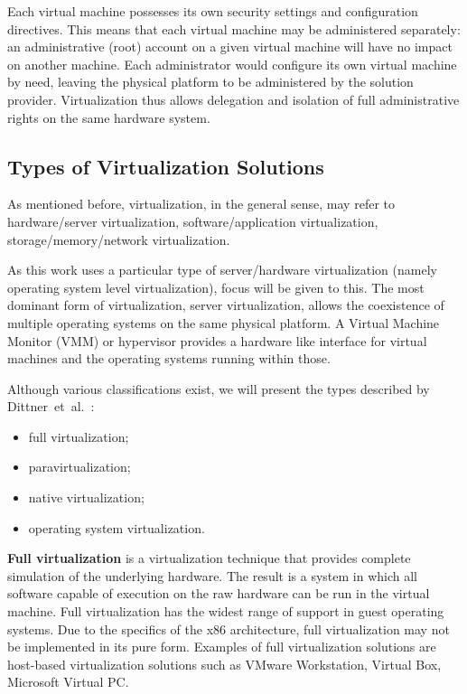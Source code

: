 Each virtual machine possesses its own security settings and configuration
directives. This means that each virtual machine may be administered
separately: an administrative (root) account on a given virtual machine will
have no impact on another machine. Each administrator would configure its own
virtual machine by need, leaving the physical platform to be administered by
the solution provider. Virtualization thus allows delegation and isolation of
full administrative rights on the same hardware system.

\subsection{Types of Virtualization Solutions}

As mentioned before, virtualization, in the general sense, may refer to
hardware/server virtualization, software/application virtualization,
storage/memory/network virtualization.

As this work uses a particular type of server/hardware virtualization (namely
operating system level virtualization), focus will be given to this. The most
dominant form of virtualization, server virtualization, allows the coexistence
of multiple operating systems on the same physical platform. A Virtual Machine
Monitor (VMM) or hypervisor provides a hardware like interface for virtual
machines and the operating systems running within those.

Although various classifications exist, we will present the types described by
Dittner~et~al.~\cite{best-damn-virt}:

\begin{itemize}
  \item full virtualization;
  \item paravirtualization;
  \item native virtualization;
  \item operating system virtualization.
\end{itemize}

\textbf{Full virtualization} is a virtualization technique that provides
complete simulation of the underlying hardware. The result is a system in
which all software capable of execution on the raw hardware can be run in the
virtual machine. Full virtualization has the widest range of support in guest
operating systems. Due to the specifics of the x86 architecture, full
virtualization may not be implemented in its pure form. Examples of
full virtualization solutions are host-based virtualization solutions such as
VMware Workstation, Virtual Box, Microsoft Virtual PC.

